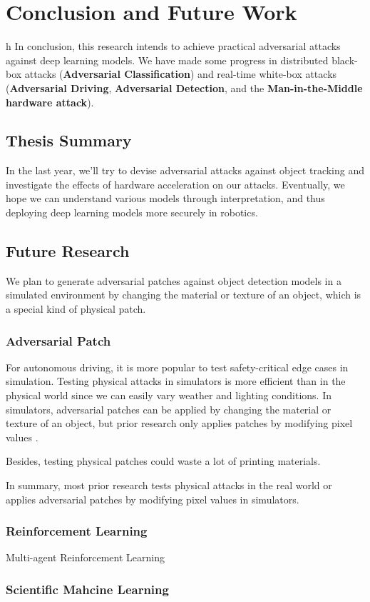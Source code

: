 \chapter{Conclusion and Future Work}
\label{chpt:conclusion}
h
In conclusion, this research intends to achieve practical adversarial attacks against deep learning models. We have made some progress in distributed black-box attacks (\textbf{Adversarial Classification}) and real-time white-box attacks (\textbf{Adversarial Driving}, \textbf{Adversarial Detection}, and the \textbf{Man-in-the-Middle hardware attack}).

\section{Thesis Summary}

In the last year, we'll try to devise adversarial attacks against object tracking and investigate the effects of hardware acceleration on our attacks. Eventually, we hope we can understand various models through interpretation, and thus deploying deep learning models more securely in robotics.

\clearpage

\section{Future Research}

We plan to generate adversarial patches against object detection models in a simulated environment by changing the material or texture of an object, which is a special kind of physical patch.
   
\subsection{Adversarial Patch}

For autonomous driving, it is more popular to test safety-critical edge cases in simulation. Testing physical attacks in simulators is more efficient than in the physical world since we can easily vary weather and lighting conditions. In simulators, adversarial patches can be applied by changing the material or texture of an object, but prior research only applies patches by modifying pixel values \cite{mathov2021enhancing} \cite{nesti2022evaluating} \cite{rossolini2022realworld}.

Besides, testing physical patches could waste a lot of printing materials.

In summary, most prior research tests physical attacks in the real world or applies adversarial patches by modifying pixel values in simulators.

\subsection{Reinforcement Learning}

Multi-agent Reinforcement Learning


\subsection{Scientific Mahcine Learning}

